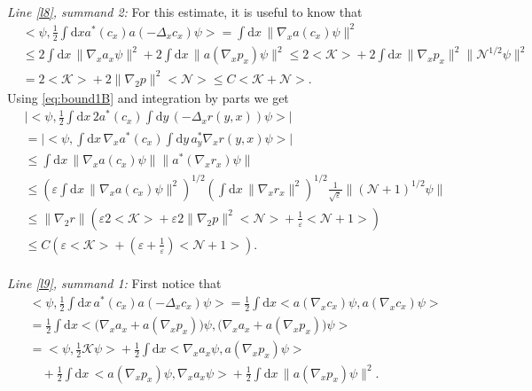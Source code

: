 \documentclass[11pt,a4paper,DIV11]{scrartcl}	%
\newcommand{\di}{\textrm{d}}		%
\newcommand{\Ncal}{\mathcal{N}}		%
\newcommand{\Kcal}{\mathcal{K}}		%
\newcommand{\estlist}[2]{\emph{\vspace{.3em}\\Line \ref{l#1}, summand #2:}}
\newcommand{\scal}[2]{\big<#1,#2\big>} %
\newcommand{\norm}[1]{\lVert#1\rVert}	%
\newcommand{\ev}[1]{\big<#1\big>}	%
\newcommand{\gradone}{\nabla_2}
\begin{document}
\begin{fleqn}[0.5em]
\estlist{8}{2}
For this estimate, it is useful to know that
\begin{equation} \label{eq:bound1B}                                     
\begin{split}
 & \scal{\psi}{\frac{1}{2}\int \di x a^\ast(c_x) a(-\Delta_x c_x)\psi} = \int \di x\, \norm{\nabla_x a(c_x)\psi}^2 \\
 & \leq 2 \int \di x\, \norm{\nabla_x a_x \psi}^2 + 2\int \di x\, \norm{a(\nabla_x p_x)\psi}^2 \leq 2\ev{\Kcal} + 2\int \di x\, \norm{\nabla_x p_x}^2 \norm{\Ncal^{1/2}\psi}^2 \\
 & = 2\ev{\Kcal}+ 2\norm{\gradone p}^2 \ev{\Ncal} \leq C\ev{\Kcal + \Ncal}.
\end{split}
\end{equation}
Using \eqref{eq:bound1B} and integration by parts we get
\begin{align*}
& \lvert \scal{\psi}{\frac{1}{2}\int \di x\, 2a^\ast(c_x) \int \di y\, (-\Delta_x r(y,x))\psi} \rvert \\
& = \lvert \scal{\psi}{\int \di x\, \nabla_x a^\ast(c_x) \int \di y\, a^\ast_y \nabla_x r(y,x) \psi}\rvert \\
& \leq \int \di x\, \norm{\nabla_x a(c_x)\psi} \norm{a^\ast(\nabla_x r_x)\psi} \\
& \leq \left( \varepsilon \int \di x\, \norm{\nabla_x a(c_x) \psi}^2 \right)^{1/2} \left( \int \di x\, \norm{\nabla_x r_x}^2 \right)^{1/2} \frac{1}{\sqrt{\varepsilon}} \norm{(\Ncal+1)^{1/2}\psi} \\
& \leq \norm{\gradone r} \left( \varepsilon 2\ev{\Kcal} + \varepsilon 2 \norm{\gradone p}^2 \ev{\Ncal} + \frac{1}{\varepsilon}\ev{\Ncal+1} \right) \\
& \leq C \left( \varepsilon \ev{\Kcal} + (\varepsilon+\frac{1}{\varepsilon})\ev{\Ncal+1} \right).
\end{align*}
\estlist{9}{1}
First notice that
\begin{align*}
 & \scal{\psi}{\frac{1}{2}\int \di x\, a^\ast(c_x) a(-\Delta_x c_x)\psi} = \frac{1}{2}\int \di x \scal{a(\nabla_x c_x)\psi}{a(\nabla_x c_x)\psi} \\
& = \frac{1}{2}\int \di x \scal{\big( \nabla_x a_x + a(\nabla_x p_x) \big)\psi}{\big(  \nabla_x a_x + a(\nabla_x p_x) \big) \psi} \\
& = \scal{\psi}{\frac{1}{2}\Kcal \psi} + \frac{1}{2}\int \di x\scal{\nabla_x
a_x \psi}{a(\nabla_x p_x)\psi} \\
& \quad + \frac{1}{2}\int \di x\, \scal{a(\nabla_x p_x)\psi}{\nabla_x a_x \psi} + \frac{1}{2}\int \di x\, \norm{a(\nabla_x p_x)\psi}^2.

\end{align*}
\end{fleqn}
\end{document}
